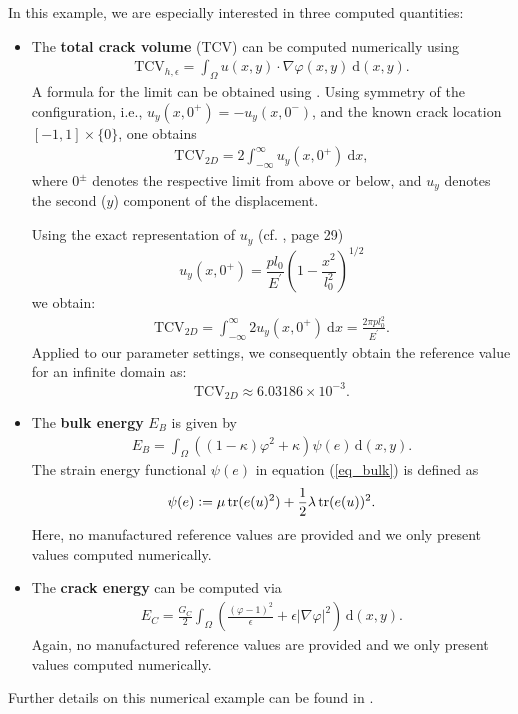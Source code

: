 In this example, we are especially interested in three computed quantities:
\begin{itemize}
 \item The \textbf{total crack volume} (TCV) can be computed numerically using
\begin{align}
\label{eq_TCV_num}
\text{TCV}_{h,\epsilon}=\int_{\Omega} u(x,y) \cdot \nabla \varphi(x,y)\ \mathrm{d}{(x,y)}.
\end{align}
A formula for the limit can be obtained using \cite{SneddLow69}.
Using symmetry of the configuration, i.e., $u_y(x,0^+) = - u_y(x,0^-)$,
and the known crack location $[-1,1]\times \{0\}$, one obtains
\begin{align*}
\text{TCV}_{2D}=2 \int_{-\infty}^{\infty} u_y (x,0^+)\ \mathrm{d}x,
\end{align*}
where $0^\pm$ denotes the respective limit from above or below, and
$u_y$ denotes the second ($y$) component of the displacement.

Using the exact representation of $u_y$ (cf. \cite{SneddLow69}, page
29)
\[
u_y(x,0^+) =  \frac{p l_0}{E^{\prime}} \left(1-\frac{x^2}{l_0^2}\right)^{1/2}
\]
we obtain:
\begin{align}
\label{eq_TCV_exact}
 \text{TCV}_{2D}  
= \int_{-\infty}^{\infty} 2 u_y (x,0^+)\ \mathrm{d}x 
= \frac{2\pi p l_0^2}{E^{\prime}}.
\end{align}
Applied to our parameter settings, we consequently
obtain the reference value for an infinite domain as:
\[
\text{TCV}_{2D} \approx 6.03186\times 10^{-3}.
\]

\item The \textbf{bulk energy} $E_B$ is given by
\begin{align}
\label{eq_bulk}
E_B= \int_{\Omega} ((1-\kappa)\varphi^2 + \kappa) \psi(e)\, \mathrm{d}{(x,y)}.
\end{align}
The strain energy functional $\psi(e)$ in equation (\ref{eq_bulk}) is defined as
\begin{align*}
 \psi(e):= \mu \operatorname{tr} (e(u)^2) + \frac{1}{2} \lambda \operatorname{tr} (e(u))^2.
\end{align*}
Here, no manufactured reference values are provided and we only present
values computed numerically.
\item The \textbf{crack energy} can be computed via
\begin{align}
\label{eq_crack}
 E_C = \frac{G_C}{2} \int_{\Omega} \left( \frac{(\varphi-1)^2}{\epsilon} +  \epsilon |\nabla \varphi|^2\right) \, \mathrm{d}{(x,y)}.
\end{align}
Again, no manufactured reference values are provided and we only present
values computed numerically.
\end{itemize}

Further details on this numerical example can be found in \cite[Chapter~7]{SchroederEtAl:2021}.


%



